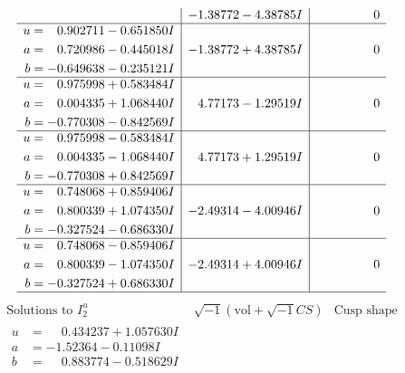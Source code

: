 \documentclass[1p]{elsarticle_modified}
\theoremstyle{definition}
\newcommand{\I}{\sqrt{-1}}
\begin{document}
$$\begin{array}{c|c|c}
 & -1.38772 - 4.38785 I & \phantom{-0.000000 } 0 \\ \hline\begin{aligned}
u &= \phantom{-}0.902711 - 0.651850 I \\
a &= \phantom{-}0.720986 - 0.445018 I \\
b &= -0.649638 - 0.235121 I\end{aligned}
 & -1.38772 + 4.38785 I & \phantom{-0.000000 } 0 \\ \hline\begin{aligned}
u &= \phantom{-}0.975998 + 0.583484 I \\
a &= \phantom{-}0.004335 + 1.068440 I \\
b &= -0.770308 - 0.842569 I\end{aligned}
 & \phantom{-}4.77173 - 1.29519 I & \phantom{-0.000000 } 0 \\ \hline\begin{aligned}
u &= \phantom{-}0.975998 - 0.583484 I \\
a &= \phantom{-}0.004335 - 1.068440 I \\
b &= -0.770308 + 0.842569 I\end{aligned}
 & \phantom{-}4.77173 + 1.29519 I & \phantom{-0.000000 } 0 \\ \hline\begin{aligned}
u &= \phantom{-}0.748068 + 0.859406 I \\
a &= \phantom{-}0.800339 + 1.074350 I \\
b &= -0.327524 - 0.686330 I\end{aligned}
 & -2.49314 - 4.00946 I & \phantom{-0.000000 } 0 \\ \hline\begin{aligned}
u &= \phantom{-}0.748068 - 0.859406 I \\
a &= \phantom{-}0.800339 - 1.074350 I \\
b &= -0.327524 + 0.686330 I\end{aligned}
 & -2.49314 + 4.00946 I & \phantom{-0.000000 } 0\\
 \hline 
 \end{array}$$\newpage$$\begin{array}{c|c|c}  
\text{Solutions to }I^u_{2}& \I (\text{vol} + \sqrt{-1}CS) & \text{Cusp shape}\\
 \hline 
\begin{aligned}
u &= \phantom{-}0.434237 + 1.057630 I \\
a &= -1.52364 - 0.11098 I \\
b &= \phantom{-}0.883774 - 0.518629 I\end{aligned}

\end{array}$$
\end{document}
